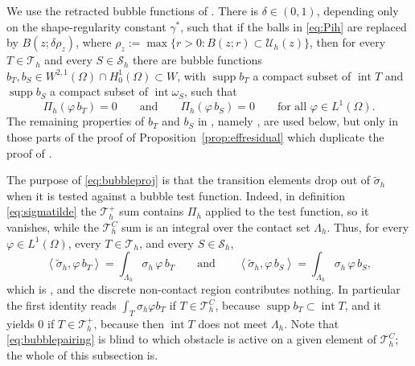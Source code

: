 \documentclass[12pt]{amsart}
\numberwithin{equation}{section}
\theoremstyle{plain}
\theoremstyle{definition}
\theoremstyle{remark}
\newcommand{\Om}{\Omega}
\newcommand{\Th}{\mathcal{T}_h}
\newcommand{\Sh}{\mathcal{S}_h}
\newcommand{\Pih}{\Pi_h}
\newcommand{\Uh}{\mathcal{U}_h}
\newcommand{\Thplus}{\Th^+}
\newcommand{\ThC}{\Th^C}
\newcommand{\Lamh}{\Lambda_h}
\begin{document}
We use the retracted bubble functions of \cite[Lemma 6.1]{NSV03}.  There is $\delta \in (0,1)$, depending only on the shape-regularity constant $\gamma^*$, such that if the balls in \eqref{eq:Pih} are replaced by $B(z;\delta\rho_z)$, where $\rho_z := \max\{r > 0 : B(z;r) \subset \Uh(z)\}$, then for every $T \in \Th$ and every $S \in \Sh$ there are bubble functions $b_T, b_S \in W^{2,1}(\Om) \cap H_0^1(\Om) \subset W$, with $\operatorname{supp} b_T$ a compact subset of $\operatorname{int} T$ and $\operatorname{supp} b_S$ a compact subset of $\operatorname{int}\omega_S$, such that
\begin{equation}
\label{eq:bubbleproj}
  \Pih(\varphi\, b_T) = 0 \qquad\text{and}\qquad \Pih(\varphi\, b_S) = 0 \qquad \text{for all } \varphi \in L^1(\Om).
\end{equation}
The remaining properties of $b_T$ and $b_S$ in \cite[Lemma 6.1]{NSV03}, namely \cite[formulas (6.1b), (6.1c), (6.2b), (6.2c)]{NSV03}, are used below, but only in those parts of the proof of Proposition~\ref{prop:effresidual} which duplicate the proof of \cite[Proposition 6.2]{NSV03}.

The purpose of \eqref{eq:bubbleproj} is that the transition elements drop out of $\tilde\sigma_h$ when it is tested against a bubble test function.  Indeed, in definition \eqref{eq:sigmatilde} the $\Thplus$ sum contains $\Pih$ applied to the test function, so it vanishes, while the $\ThC$ sum is an integral over the contact set $\Lamh$.  Thus, for every $\varphi \in L^1(\Om)$, every $T\in\Th$, and every $S\in\Sh$,
\begin{equation}
\label{eq:bubblepairing}
  \left<\tilde\sigma_h, \varphi\, b_T\right> = \int_{\Lamh} \sigma_h\, \varphi\, b_T
  \qquad\text{and}\qquad
  \left<\tilde\sigma_h, \varphi\, b_S\right> = \int_{\Lamh} \sigma_h\, \varphi\, b_S,
\end{equation}
which is \cite[formula (6.4)]{NSV03}, and the discrete non-contact region contributes nothing.  In particular the first identity reads $\int_T \sigma_h \varphi b_T$ if $T \in \ThC$, because $\operatorname{supp} b_T \subset \operatorname{int} T$, and it yields $0$ if $T \in \Thplus$, because then $\operatorname{int} T$ does not meet $\Lamh$.  Note that \eqref{eq:bubblepairing} is blind to which obstacle is active on a given element of $\ThC$; the whole of this subsection is.
\end{document}
